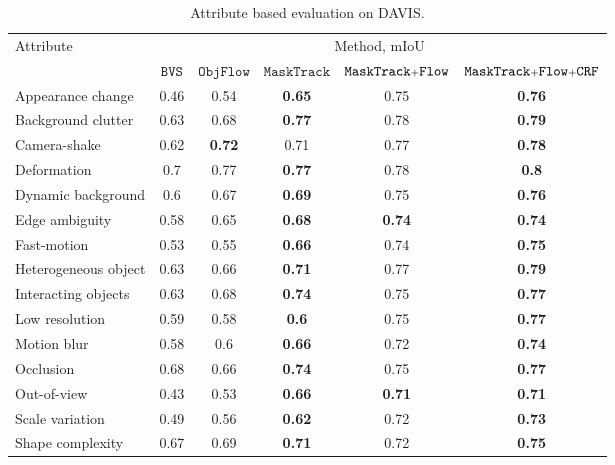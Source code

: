 \documentclass[10pt,twocolumn,letterpaper]{article}
\begin{document}
\begin{table*}
\begin{centering}
\begingroup
\begin{tabular}{l|ccc||cc}
\multirow{2}{*}{Attribute} & \multicolumn{5}{c}{Method, mIoU}\\
& $\mathtt{BVS}$ \cite{Maerki2016Cvpr} & $\mathtt{ObjFlow}$ \cite{Tsai2016Cvpr}& $\mathtt{MaskTrack}$ & $\mathtt{MaskTrack\mathsmaller{+}Flow}$ & $\mathtt{MaskTrack\mathsmaller{+}Flow \mathsmaller{+}CRF}$\tabularnewline
\hline
\hline
Appearance change & 0.46& 0.54& \textbf{0.65} & 0.75& \textbf{0.76}\tabularnewline
Background clutter& 0.63 & 0.68 & \textbf{0.77} & 0.78 & \textbf{0.79}\tabularnewline
Camera-shake& 0.62 & \textbf{0.72} & 0.71 & 0.77 & \textbf{0.78}\tabularnewline
Deformation& 0.7& 0.77& \textbf{0.77} &0.78 & \textbf{0.8}\tabularnewline
Dynamic background& 0.6 & 0.67 & \textbf{0.69}& 0.75 & \textbf{0.76}\tabularnewline
Edge ambiguity& 0.58 & 0.65& \textbf{0.68} & \textbf{0.74} & \textbf{0.74}\tabularnewline
Fast-motion & 0.53 & 0.55& \textbf{0.66} & 0.74 & \textbf{0.75}\tabularnewline
Heterogeneous object& 0.63 & 0.66 & \textbf{0.71} & 0.77 &\textbf{0.79}\tabularnewline
Interacting objects& 0.63 & 0.68 & \textbf{0.74} & 0.75 &\textbf{0.77}\tabularnewline
Low resolution& 0.59& 0.58& \textbf{0.6} & 0.75 & \textbf{0.77}\tabularnewline
Motion blur& 0.58& 0.6& \textbf{0.66}& 0.72 & \textbf{0.74}\tabularnewline
Occlusion& 0.68 & 0.66 & \textbf{0.74} & 0.75 & \textbf{0.77}\tabularnewline
Out-of-view& 0.43 & 0.53 & \textbf{0.66} & \textbf{0.71} & \textbf{0.71}\tabularnewline
Scale variation& 0.49 & 0.56 & \textbf{0.62}& 0.72 & \textbf{0.73}\tabularnewline
Shape complexity& 0.67 & 0.69 & \textbf{0.71} & 0.72 & \textbf{0.75}\tabularnewline
\end{tabular}\endgroup
\par\end{centering}
\caption{\label{tab:attr-eval}Attribute based evaluation on DAVIS.}
\end{table*}
\end{document}
